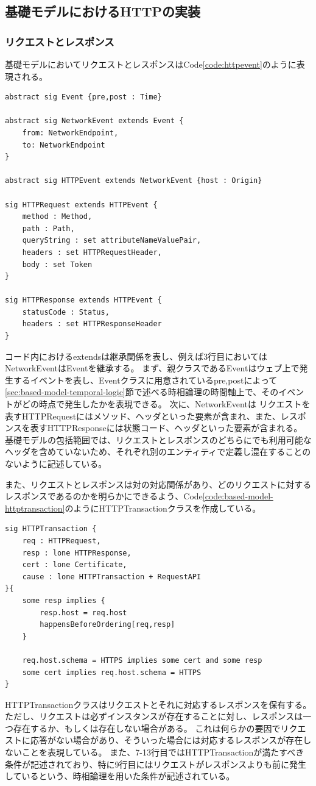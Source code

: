 \documentclass[12pt,a4paper]{jbook}
\begin{document}
\subsection{基礎モデルにおけるHTTPの実装}
\label{sec:based-model-http}

\subsubsection{リクエストとレスポンス}
基礎モデルにおいてリクエストとレスポンスはCode\ref{code:httpevent}のように表現される。
\begin{lstlisting}[caption=リクエストとレスポンスを表現するクラス, label=code:httpevent]
abstract sig Event {pre,post : Time}

abstract sig NetworkEvent extends Event {
	from: NetworkEndpoint,
	to: NetworkEndpoint
}

abstract sig HTTPEvent extends NetworkEvent {host : Origin}

sig HTTPRequest extends HTTPEvent { 
	method : Method,
	path : Path,
	queryString : set attributeNameValuePair,
	headers : set HTTPRequestHeader,
	body : set Token
}

sig HTTPResponse extends HTTPEvent {
	statusCode : Status,
	headers : set HTTPResponseHeader
}
\end{lstlisting}
コード内におけるextendsは継承関係を表し、例えば3行目においてはNetworkEventはEventを継承する。
まず、親クラスであるEventはウェブ上で発生するイベントを表し、Eventクラスに用意されているpre,postによって\ref{sec:based-model-temporal-logic}節で述べる時相論理の時間軸上で、そのイベントがどの時点で発生したかを表現できる。
次に、NetworkEventは
リクエストを表すHTTPRequestにはメソッド、ヘッダといった要素が含まれ、また、レスポンスを表すHTTPResponseには状態コード、ヘッダといった要素が含まれる。
基礎モデルの包括範囲では、リクエストとレスポンスのどちらにでも利用可能なヘッダを含めていないため、それぞれ別のエンティティで定義し混在することのないように記述している。

また、リクエストとレスポンスは対の対応関係があり、どのリクエストに対するレスポンスであるのかを明らかにできるよう、Code\ref{code:based-model-httptransaction}のようにHTTPTransactionクラスを作成している。
\begin{lstlisting}[caption=リクエストとレスポンスの対応関係, label=code:based-model-httptransaction]
sig HTTPTransaction {
	req : HTTPRequest,
	resp : lone HTTPResponse,
	cert : lone Certificate,
	cause : lone HTTPTransaction + RequestAPI
}{
	some resp implies {
		resp.host = req.host
		happensBeforeOrdering[req,resp]
	}

	req.host.schema = HTTPS implies some cert and some resp
	some cert implies req.host.schema = HTTPS
}
\end{lstlisting}
HTTPTransactionクラスはリクエストとそれに対応するレスポンスを保有する。
ただし、リクエストは必ずインスタンスが存在することに対し、レスポンスは一つ存在するか、もしくは存在しない場合がある。
これは何らかの要因でリクエストに応答がない場合があり、そういった場合には対応するレスポンスが存在しないことを表現している。
また、7-13行目ではHTTPTransactionが満たすべき条件が記述されており、特に9行目にはリクエストがレスポンスよりも前に発生しているという、時相論理を用いた条件が記述されている。
\end{document}
